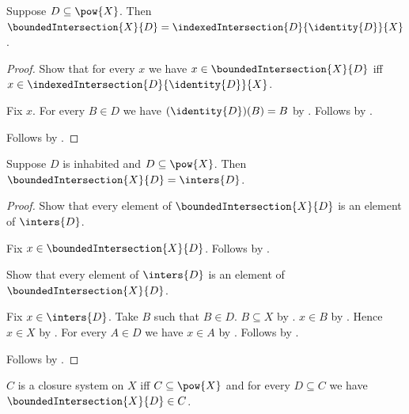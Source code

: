 \begin{proposition}\label{bounded_intersection_as_indexed_intersection}
    Suppose $D\subseteq\pow{X}$.
    Then
        $\boundedIntersection{X}{D}
            =\indexedIntersection{D}{\identity{D}}{X}$.
\end{proposition}
\begin{proof}
    Show that for every $x$ we have
        $x\in\boundedIntersection{X}{D}$ iff
        $x\in\indexedIntersection{D}{\identity{D}}{X}$.
    \begin{subproof}
        Fix $x$.
        For every $B\in D$ we have $(\identity{D})(B)=B$ by
            .
        Follows by
            .
    \end{subproof}
    Follows by .
\end{proof}

\begin{proposition}\label{bounded_intersection_eq_inters}
    Suppose $D$ is inhabited and $D\subseteq\pow{X}$.
    Then $\boundedIntersection{X}{D}=\inters{D}$.
\end{proposition}
\begin{proof}
    Show that every element of $\boundedIntersection{X}{D}$ is an element of
        $\inters{D}$.
    \begin{subproof}
        Fix $x\in\boundedIntersection{X}{D}$.
        Follows by
            .
    \end{subproof}
    Show that every element of $\inters{D}$ is an element of
        $\boundedIntersection{X}{D}$.
    \begin{subproof}
        Fix $x\in\inters{D}$.
        Take $B$ such that $B\in D$.
        $B\subseteq X$ by .
        $x\in B$ by .
        Hence $x\in X$ by .
        For every $A\in D$ we have $x\in A$ by
            .
        Follows by .
    \end{subproof}
    Follows by .
\end{proof}

\begin{definition}\label{closure_system}
    $C$ is a closure system on $X$ iff
        $C\subseteq\pow{X}$ and
        for every $D\subseteq C$ we have
            $\boundedIntersection{X}{D}\in C$.
\end{definition}

